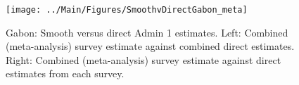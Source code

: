 \documentclass[12pt]{article}\usepackage[]{graphicx}\usepackage[]{color}
\newenvironment{knitrout}{}{} %
\begin{document}

\begin{knitrout}
\color{fgcolor}\begin{figure}[bht]

{\centering \texttt{[image: ../Main/Figures/SmoothvDirectGabon\_meta]} 

}

\caption[Gabon]{Gabon: Smooth versus direct Admin 1 estimates. Left: Combined (meta-analysis) survey estimate against combined direct estimates. Right: Combined (meta-analysis) survey estimate against direct estimates from each survey.}\label{fig:unnamed-chunk-123}
\end{figure}


\end{knitrout}
\end{document}
